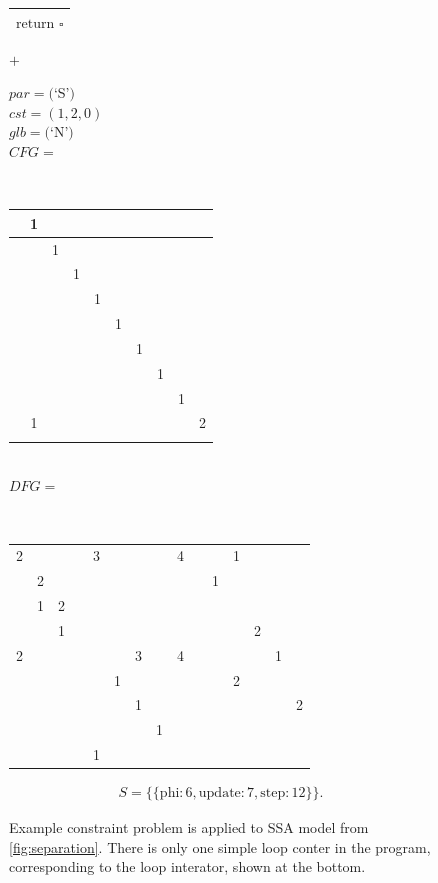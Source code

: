 \begin{figure}
\begin{minipage}{0.22\textwidth}
\begin{tabular}{|l|}
$\text{return }\square$\\
\hline
\end{tabular}
\end{minipage}
\begin{minipage}{0.04\textwidth}
\centering
$+$
\end{minipage}
\begin{minipage}{0.27\textwidth}
$par=($`S'$)$\\
$cst=(1,2,0)$\\
$glb=($`N'$)$\\
$CFG=$\\[1pt]{
\tiny\tt\bf
\setlength{\tabcolsep}{1pt}
\renewcommand{\arraystretch}{0.7}
\begin{tabular}{|c|c|c|c|c|c|c|c|c|c|}
\hline
\hphantom{1}&1&&&&&&&&\\[-0.5mm]
\hline
&&1&&&&&&&\\[-0.5mm]
\hline
&&&1&&&&&&\\[-0.5mm]
\hline
&&&&1&&&&&\\[-0.5mm]
\hline
&&&&&1&&&&\\[-0.5mm]
\hline
&&&&&&1&&&\\[-0.5mm]
\hline
&&&&&&&1&&\\[-0.5mm]
\hline
&&&&&&&&1&\\[-0.5mm]
\hline
&1&&&&&&&&2\\[-0.5mm]
\hline
&&&&&&&&&\\
\hline
\end{tabular}}\\[0.75em]
$DFG=$\\[1pt]{
\tiny\tt\bf
\setlength{\tabcolsep}{1pt}
\renewcommand{\arraystretch}{0.7}
\begin{tabular}{|c|c|c|c|c|c|c|c|c|c||c||c|c|c||c|}
\hline
\hphantom{1}&&&\hphantom{1}&&&&&\hphantom{1}&\hphantom{1}&&&&&\\
\hline
2&&&&3&&&&4&&&1&&&\\[-0.5mm]
\hline
&2&&&&&&&&&1&&&&\\[-0.5mm]
\hline
&1&2&&&&&&&&&&&&\\[-0.5mm]
\hline
&&1&&&&&&&&&&2&&\\[-0.5mm]
\hline
2&&&&&&3&&4&&&&&1&\\[-0.5mm]
\hline
&&&&&1&&&&&&2&&&\\[-0.5mm]
\hline
&&&&&&1&&&&&&&&2\\[-0.5mm]
\hline
&&&&&&&1&&&&&&&\\[-0.5mm]
\hline
&&&&1&&&&&&&&&&\\
\hline
\end{tabular}}
\end{minipage}

\begin{align*}
S=\{\{\text{phi}:6,\text{update}:7,\text{step}:12\}\}.
\end{align*}

\caption{Example constraint problem is applied to SSA model from
         \autoref{fig:separation}.
         There is only one simple loop conter in the program, corresponding to
         the loop interator, shown at the bottom.}
\end{figure}

